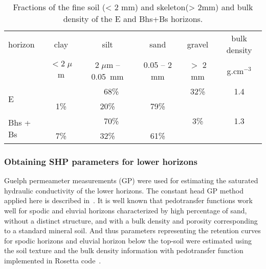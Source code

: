 \documentclass[review]{elsarticle}
\begin{document}
 \begin{table}[ht]
 	\begin{center}
 		\caption{Fractions of the fine soil (< 2 mm) and skeleton(> 2mm) and bulk density of the E and Bhs+Bs horizons.}
 		\begin{small}
 			\doublespacing
 			\begin{tabular}{l c  c  c  c  c}
 				\toprule
 				horizon & clay & silt & sand  & gravel & bulk density  \\ 
 				&  $<2\;\mu$m & $2\;\mu$m -- 0.05~mm & 0.05 -- 2 mm & $>$ 2 mm & g.cm$^{-3}$ \\ \hline
 				\multirow{2}{*}{E}      & \multicolumn{3}{c}{68\%}               & \multirow{1}{*}{32\%}  &\multirow{1}{*}{1.4}   \\ 
 				\cmidrule{2-4}
 				&  1\%               & 20\%                        & 79\%      & &\\
 				
 				\multirow{2}{*}{Bhs + Bs }      & \multicolumn{3}{c}{70\%}               & \multirow{1}{*}{3\%}  &\multirow{1}{*}{1.3}   \\ 
 				\cmidrule{2-4}
 				&7\%           & 32\%                       & 61\%          & &\\
 				
 				\toprule
 			\end{tabular}
 		\end{small}
 		\label{tab:soiltxt}
 	\end{center}
 \end{table}







\subsubsection{Obtaining SHP parameters for lower horizons}
\label{dolni}

Guelph permeameter measurements (GP) were used for estimating the saturated hydraulic conductivity of the lower horizons.  The constant head GP method applied here is described in~\citep{Jacka1}.
It is well known that pedotransfer functions work well for spodic and eluvial horizons characterized by high percentage of sand, without a distinct structure, and with a bulk density and porosity corresponding to a standard mineral soil. And thus parameters representing the retention curves for spodic horizons and eluvial horizon below the top-soil were estimated using the soil texture and the bulk density information with pedotransfer function implemented in Rosetta code~\citep{Schaap}.
\end{document}
